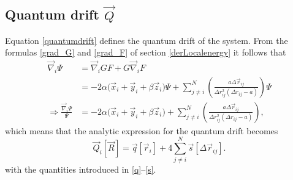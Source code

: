 \documentclass[a4paper,8pt]{article}
\begin{document}
\subsection{Quantum drift $\vec{Q}$}\label{derQuantumdrift}
Equation \eqref{quantumdrift} defines the quantum drift of the system. From the formulas \eqref{grad_G} and \eqref{grad_F} of section \ref{derLocalenergy} it follows that
\begin{align}
\vec{\nabla}_i\Psi &= \vec{\nabla}_i G F + G \vec{\nabla}_i F \nonumber\\
&= -2\alpha\Big(\vec{x}_i+\vec{y}_i+\beta\vec{z}_i\Big)\Psi + \sum\limits_{j \neq i}^N \left(\frac{a\Delta\vec{r}_{ij}}{\Delta{r}_{ij}^2(\Delta{r}_{ij}-a)}\right) \Psi \nonumber\\
\Longrightarrow \frac{\vec{\nabla}_i\Psi}{\Psi} &= -2\alpha\Big(\vec{x}_i+\vec{y}_i+\beta\vec{z}_i\Big) + \sum\limits_{j \neq i}^N \left(\frac{a\Delta\vec{r}_{ij}}{\Delta{r}_{ij}^2(\Delta{r}_{ij}-a)}\right),
\end{align}
which means that the analytic expression for the quantum drift becomes
\begin{equation}
\vec{Q}_i[\vec{R}] = \vec{q}[\vec{r}_i] + 4\sum\limits_{j \neq i}^N \vec{s}[\Delta\vec{r}_{ij}]. \label{compQD}
\end{equation}
with the quantities introduced in \eqref{q}–\eqref{s}.
\end{document}
